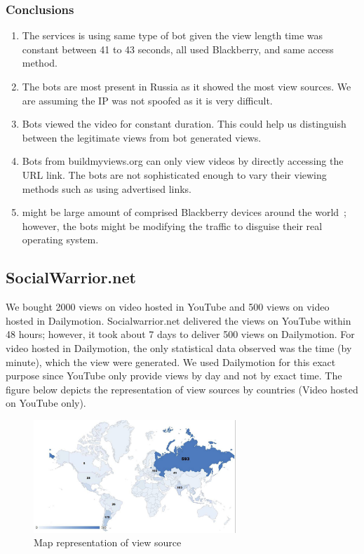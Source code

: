 \documentclass[conference]{IEEEtran}
\begin{document}
\subsubsection*{Conclusions}

\begin{enumerate}
  \item The services is using same type of bot given the view length time was constant between 41 to 43 seconds, all used Blackberry, and same access method.
  \item The bots are most present in Russia as it showed the most view sources. We are assuming the IP was not spoofed as it is very difficult.
  \item Bots viewed the video for constant duration. This could help us distinguish between the legitimate views from bot generated views.
  \item Bots from buildmyviews.org can only view videos by directly accessing the URL link. The bots are not sophisticated enough to vary their viewing methods such as using advertised links.
  \item might be large amount of comprised Blackberry devices around the world~\cite{c12, c13}; however, the bots might be modifying the traffic to disguise their real operating system.
\end{enumerate}

\subsection{SocialWarrior.net}

We bought 2000 views on video hosted in YouTube and 500 views on video hosted in Dailymotion. Socialwarrior.net delivered the views on YouTube within 48 hours; however, it took about 7 days to deliver 500 views on Dailymotion. For video hosted in Dailymotion, the only statistical data observed was the time (by minute), which the view were generated. We used Dailymotion for this exact purpose since YouTube only provide views by day and not by exact time. The figure below depicts the representation of view sources by countries (Video hosted on YouTube only).

\begin{figure}[h]
  \centering
  \includegraphics[width=3.0in]{fig6a}
  \caption{Map representation of view source}
\end{figure}
\end{document}
